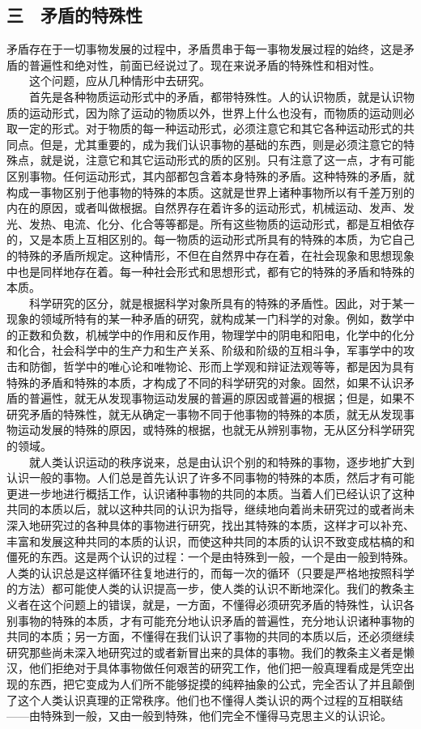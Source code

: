 \documentclass[cn,11pt,chinese]{elegantbook}
\def\myformat#1{\hfil\hfil #1}
\begin{document}
\subsection*{\myformat{三　矛盾的特殊性}}
矛盾存在于一切事物发展的过程中，矛盾贯串于每一事物发展过程的始终，这是矛盾的普遍性和绝对性，前面已经说过了。现在来说矛盾的特殊性和相对性。\\
　　这个问题，应从几种情形中去研究。\\
　　首先是各种物质运动形式中的矛盾，都带特殊性。人的认识物质，就是认识物质的运动形式，因为除了运动的物质以外，世界上什么也没有，而物质的运动则必取一定的形式。对于物质的每一种运动形式，必须注意它和其它各种运动形式的共同点。但是，尤其重要的，成为我们认识事物的基础的东西，则是必须注意它的特殊点，就是说，注意它和其它运动形式的质的区别。只有注意了这一点，才有可能区别事物。任何运动形式，其内部都包含着本身特殊的矛盾。这种特殊的矛盾，就构成一事物区别于他事物的特殊的本质。这就是世界上诸种事物所以有千差万别的内在的原因，或者叫做根据。自然界存在着许多的运动形式，机械运动、发声、发光、发热、电流、化分、化合等等都是。所有这些物质的运动形式，都是互相依存的，又是本质上互相区别的。每一物质的运动形式所具有的特殊的本质，为它自己的特殊的矛盾所规定。这种情形，不但在自然界中存在着，在社会现象和思想现象中也是同样地存在着。每一种社会形式和思想形式，都有它的特殊的矛盾和特殊的本质。\\
　　科学研究的区分，就是根据科学对象所具有的特殊的矛盾性。因此，对于某一现象的领域所特有的某一种矛盾的研究，就构成某一门科学的对象。例如，数学中的正数和负数，机械学中的作用和反作用，物理学中的阴电和阳电，化学中的化分和化合，社会科学中的生产力和生产关系、阶级和阶级的互相斗争，军事学中的攻击和防御，哲学中的唯心论和唯物论、形而上学观和辩证法观等等，都是因为具有特殊的矛盾和特殊的本质，才构成了不同的科学研究的对象。固然，如果不认识矛盾的普遍性，就无从发现事物运动发展的普遍的原因或普遍的根据；但是，如果不研究矛盾的特殊性，就无从确定一事物不同于他事物的特殊的本质，就无从发现事物运动发展的特殊的原因，或特殊的根据，也就无从辨别事物，无从区分科学研究的领域。\\
　　就人类认识运动的秩序说来，总是由认识个别的和特殊的事物，逐步地扩大到认识一般的事物。人们总是首先认识了许多不同事物的特殊的本质，然后才有可能更进一步地进行概括工作，认识诸种事物的共同的本质。当着人们已经认识了这种共同的本质以后，就以这种共同的认识为指导，继续地向着尚未研究过的或者尚未深入地研究过的各种具体的事物进行研究，找出其特殊的本质，这样才可以补充、丰富和发展这种共同的本质的认识，而使这种共同的本质的认识不致变成枯槁的和僵死的东西。这是两个认识的过程：一个是由特殊到一般，一个是由一般到特殊。人类的认识总是这样循环往复地进行的，而每一次的循环（只要是严格地按照科学的方法）都可能使人类的认识提高一步，使人类的认识不断地深化。我们的教条主义者在这个问题上的错误，就是，一方面，不懂得必须研究矛盾的特殊性，认识各别事物的特殊的本质，才有可能充分地认识矛盾的普遍性，充分地认识诸种事物的共同的本质；另一方面，不懂得在我们认识了事物的共同的本质以后，还必须继续研究那些尚未深入地研究过的或者新冒出来的具体的事物。我们的教条主义者是懒汉，他们拒绝对于具体事物做任何艰苦的研究工作，他们把一般真理看成是凭空出现的东西，把它变成为人们所不能够捉摸的纯粹抽象的公式，完全否认了并且颠倒了这个人类认识真理的正常秩序。他们也不懂得人类认识的两个过程的互相联结——由特殊到一般，又由一般到特殊，他们完全不懂得马克思主义的认识论。\\
\end{document}
